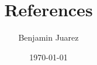 \documentclass[11pt]{article}
\begin{document}
\title{References}
\author{Benjamin Juarez}
\date{\today}
\maketitle


% 
% 





{}
% 
% 


\nocite{*}
\end{document}
